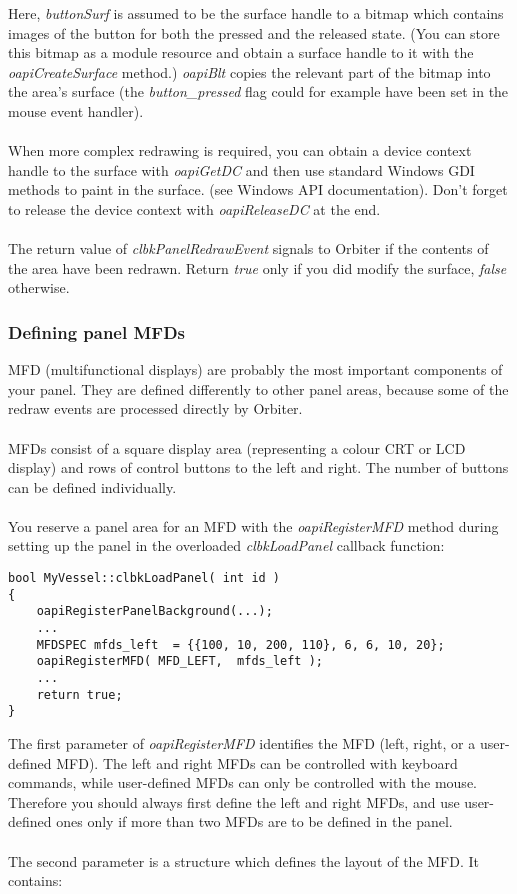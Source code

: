 \documentclass[Orbiter Developer Manual.tex]{subfiles}
\begin{document}
\noindent
Here, \textit{buttonSurf} is assumed to be the surface handle to a bitmap which contains images of the button for both the pressed and the released state. (You can store this bitmap as a module resource and obtain a surface handle to it with the \textit{oapiCreateSurface} method.) \textit{oapiBlt} copies the relevant part of the bitmap into the area's surface (the \textit{button\_pressed} flag could for example have been set in the mouse event handler).\\
\\
When more complex redrawing is required, you can obtain a device context handle to the surface with \textit{oapiGetDC} and then use standard Windows GDI methods to paint in the surface. (see Windows API documentation). Don't forget to release the device context with \textit{oapiReleaseDC} at the end.\\
\\
The return value of \textit{clbkPanelRedrawEvent} signals to Orbiter if the contents of the area have been redrawn. Return \textit{true} only if you did modify the surface, \textit{false} otherwise.


\subsubsection{Defining panel MFDs}
\label{sssec:def_panel_mfd}
MFD (multifunctional displays) are probably the most important components of your panel. They are defined differently to other panel areas, because some of the redraw events are processed directly by Orbiter.\\
\\
MFDs consist of a square display area (representing a colour CRT or LCD display) and rows of control buttons to the left and right. The number of buttons can be defined individually.\\
\\
You reserve a panel area for an MFD with the \textit{oapiRegisterMFD} method during setting up the panel in the overloaded \textit{clbkLoadPanel} callback function:

\begin{lstlisting}
bool MyVessel::clbkLoadPanel( int id )
{
	oapiRegisterPanelBackground(...);
	...
	MFDSPEC mfds_left  = {{100, 10, 200, 110}, 6, 6, 10, 20};
	oapiRegisterMFD( MFD_LEFT,  mfds_left );
	...
	return true;
}
\end{lstlisting}

\noindent
The first parameter of \textit{oapiRegisterMFD} identifies the MFD (left, right, or a user-defined MFD). The left and right MFDs can be controlled with keyboard commands, while user-defined MFDs can only be controlled with the mouse. Therefore you should always first define the left and right MFDs, and use user-defined ones only if more than two MFDs are to be defined in the panel.\\
\\
The second parameter is a structure which defines the layout of the MFD. It contains:
\end{document}
